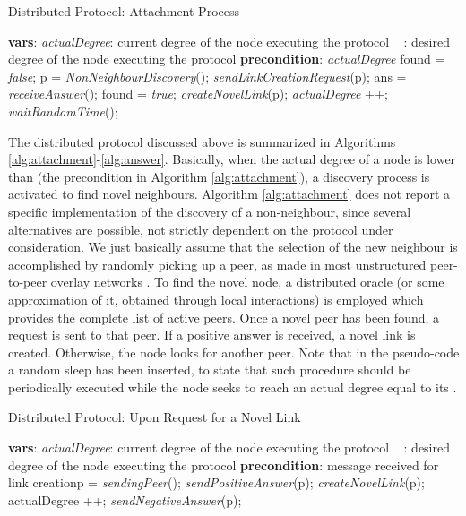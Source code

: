\documentclass[a4paper,twosided]{article}
\begin{document}
\begin{algorithm}[t]
\caption{Distributed Protocol: Attachment Process} 
\label{alg:attachment}
\begin{algorithmic}
\STATE \textbf{vars}: \textit{actualDegree}: current degree of the node executing the protocol
\STATE \qquad \mbox{   } : desired degree of the node executing the protocol
\STATE \STATE \textbf{precondition}: \textit{actualDegree} \STATE \STATE found = \textit{false};
\STATE p = \textit{NonNeighbourDiscovery}(); \STATE \textit{sendLinkCreationRequest}(p);
  \STATE ans = \textit{receiveAnswer}();
    \STATE found = \textit{true};
    \STATE \textit{createNovelLink}(p);
    \STATE \textit{actualDegree} ++;
  \ENDIF
\ENDWHILE
\STATE \textit{waitRandomTime}();
\end{algorithmic}
\end{algorithm}

The distributed protocol discussed above is summarized in Algorithms \ref{alg:attachment}-\ref{alg:answer}. Basically, when the actual degree of a node is lower than  (the precondition in Algorithm \ref{alg:attachment}), a discovery process is activated to find novel neighbours. Algorithm \ref{alg:attachment} does not report a specific implementation of the discovery of a non-neighbour, since several alternatives are possible, not strictly dependent on the protocol under consideration. 
We just basically assume that the selection of the new neighbour is accomplished by randomly picking up a peer, as made in most unstructured peer-to-peer overlay networks \cite{guclu,HaridasanvanRenesse08,keidar,linlin,Qi}. 
To find the novel node, a distributed oracle (or some approximation of it, obtained through local interactions) is employed which provides the complete list of active peers. 
Once a novel peer has been found, a request is sent to that peer. If a positive answer is received, a novel link is created. Otherwise, the node looks for another peer. Note that in the pseudo-code a random sleep has been inserted, to state that such procedure should be periodically executed while the node seeks to reach an actual degree equal to its .

\begin{algorithm}[t]
\caption{Distributed Protocol: Upon Request for a Novel Link} 
\label{alg:answer}
\begin{algorithmic}
\STATE \textbf{vars}: \textit{actualDegree}: current degree of the node executing the protocol
\STATE \qquad \mbox{   } : desired degree of the node executing the protocol
\STATE \STATE \textbf{precondition}: message received for link creation\STATE \STATE p = \textit{sendingPeer}(); 
  \STATE \textit{sendPositiveAnswer}(p);
  \STATE \textit{createNovelLink}(p);
  \STATE actualDegree ++;
\ELSE
  \STATE \textit{sendNegativeAnswer}(p);
\ENDIF
\end{algorithmic}
\end{algorithm}
\end{document}
